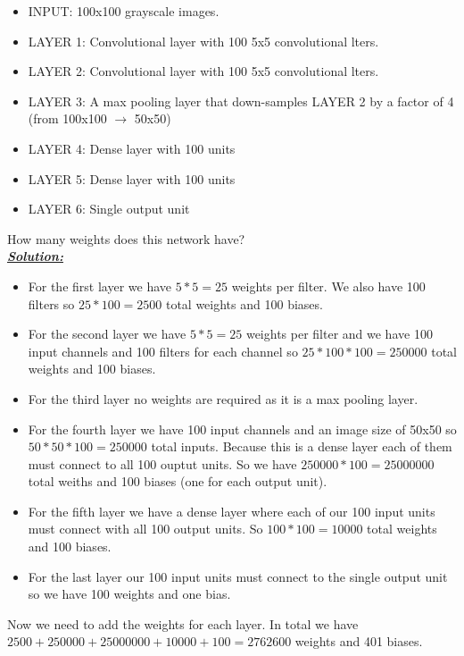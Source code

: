 \documentclass{article}
\begin{document}
\begin{itemize}
    \item INPUT: 100x100 grayscale images.
    \item LAYER 1: Convolutional layer with 100 5x5 convolutional lters.
    \item LAYER 2: Convolutional layer with 100 5x5 convolutional lters.
    \item LAYER 3: A max pooling layer that down-samples LAYER 2 by a factor of 4 (from 100x100 $\rightarrow$ 50x50)
    \item LAYER 4: Dense layer with 100 units
    \item LAYER 5: Dense layer with 100 units
    \item LAYER 6: Single output unit
\end{itemize}

\noindent How many weights does this network have? \\

\noindent \underline{\textbf{\textit{Solution:}}} \\ 

\begin{itemize}
  \item For the first layer we have $5*5 = 25$ weights per filter. We also have 100 filters so $25*100=2500$ total weights and 100 biases.
  \item For the second layer we have $5*5=25$ weights per filter and we have 100 input channels and 100 filters for each channel so $25*100*100=250000$ total weights and 100 biases.
  \item For the third layer no weights are required as it is a max pooling layer.
  \item For the fourth layer we have 100 input channels and an image size of 50x50 so $50*50*100=250000$ total inputs.
        Because this is a dense layer each of them must connect to all 100 ouptut units. So we have $250000*100=25000000$ total weiths and 100 biases (one for each output unit).
  \item For the fifth layer we have a dense layer where each of our 100 input units must connect with all 100 output units. So $100*100=10000$ total weights and 100 biases.
  \item For the last layer our 100 input units must connect to the single output unit so we have 100 weights and one bias. 
\end{itemize}

Now we need to add the weights for each layer. In total we have $2500+250000+25000000+10000+100 = 2762600$ weights and 401 biases.
\end{document}
